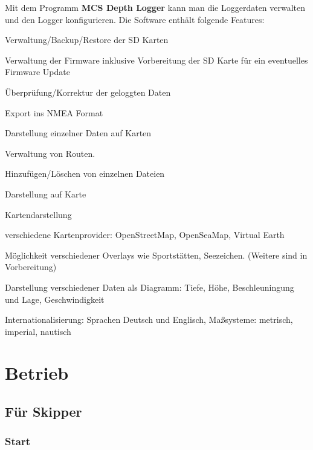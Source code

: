 \documentclass[pdftex, fontsize=8pt, paper=130mm:92mm,pagesize]{scrartcl}
\let\stdsection\section
\renewcommand\section{\newpage\stdsection}
\begin{document}
Mit dem Programm \textbf{MCS Depth Logger} kann man die Loggerdaten verwalten und den Logger konfigurieren. Die Software enthält folgende Features:
\begin{compactenum}
    \item Verwaltung/Backup/Restore der SD Karten
    \item Verwaltung der Firmware inklusive Vorbereitung der SD Karte für ein eventuelles Firmware Update
    \item Überprüfung/Korrektur der geloggten Daten
    \item Export ins NMEA Format
    \item Darstellung einzelner Daten auf Karten
    \item Verwaltung von Routen.
    \begin{compactenum}
        \item Hinzufügen/Löschen von einzelnen Dateien
        \item Darstellung auf Karte
    \end{compactenum}
    \item Kartendarstellung
    \begin{compactenum}
        \item verschiedene Kartenprovider: OpenStreetMap, OpenSeaMap, Virtual Earth
        \item Möglichkeit verschiedener Overlays wie Sportstätten, Seezeichen. (Weitere sind in Vorbereitung)
        \item Darstellung verschiedener Daten als Diagramm: Tiefe, Höhe, Beschleuningung und Lage, Geschwindigkeit
    \end{compactenum}
    \item Internationalisierung: Sprachen Deutsch und Englisch, Maßsysteme: metrisch, imperial, nautisch
\end{compactenum}

\section{Betrieb}

\subsection{Für Skipper}

\subsubsection{Start}
\end{document}
